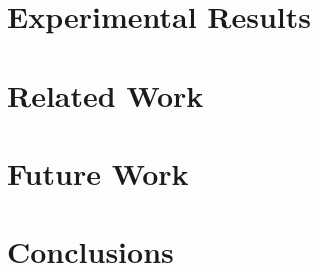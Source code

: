 \documentclass[journal]{IEEEtran}
\begin{document}
\section{Experimental Results}
\label{sec:results}


%

%

\section{Related Work}
\label{sec:related_work}


\section{Future Work}
\label{sec:future_work}


\section{Conclusions}
\label{sec:conc}




\end{document}
